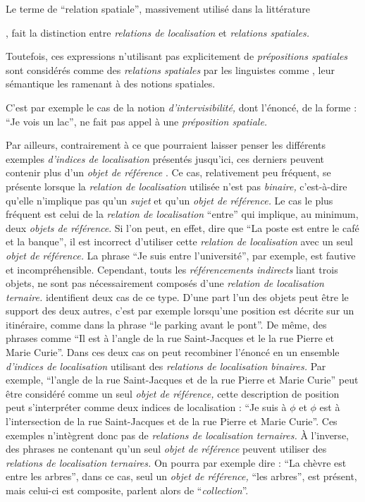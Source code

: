 Le terme de \enquote{relation spatiale}, massivement utilisé dans la
littérature 

\textcite{Duchene2019}, fait la distinction entre \emph{relations de
  localisation} et \emph{relations spatiales.}

Toutefois, ces expressions n'utilisant pas explicitement de
\emph{prépositions spatiales} sont considérés comme des
\emph{relations spatiales} par les linguistes comme
\textcite{Vandeloise1986}, leur sémantique les ramenant à des notions
spatiales.

C'est par exemple le cas de la notion \emph{d'intervisibilité,} dont
l'énoncé, de la forme : \enquote{Je vois un lac}, ne fait pas appel à
une \emph{préposition spatiale.}

Par ailleurs, contrairement à ce que pourraient laisser penser les
différents exemples \emph{d'indices de localisation} présentés
jusqu'ici, ces derniers peuvent contenir plus d'un \emph{objet de
  référence} \autocite{Clementini2013}. Ce cas, relativement peu
fréquent, se présente lorsque la \emph{relation de localisation}
utilisée n'est pas \emph{binaire,} c'est-à-dire qu'elle n'implique pas
qu'un \emph{sujet} et qu'un \emph{objet de référence.} Le cas le plus
fréquent est celui de la \emph{relation de localisation}
\enquote{entre} qui implique, au minimum, deux \emph{objets de
  référence}. Si l'on peut, en effet, dire que \enquote{La poste est
  entre le café et la banque}, il est incorrect d'utiliser cette
\emph{relation de localisation} avec un seul \emph{objet de
  référence.} La phrase \enquote{Je suis entre l'université}, par
exemple, est fautive et incompréhensible. Cependant, touts les
\emph{référencements indirects} liant trois objets, ne sont pas
nécessairement composés d'une \emph{relation de localisation
  ternaire.} \textcite{Duchene2019} identifient deux cas de ce
type. D'une part l'un des objets peut être le support des deux autres,
c'est par exemple lorsqu'une position est décrite sur un itinéraire,
comme dans la phrase \enquote{le parking avant le pont}. De même, des
phrases comme \enquote{Il est à l'angle de la rue Saint-Jacques et le
  la rue Pierre et Marie Curie}. Dans ces deux cas on peut recombiner
l'énoncé en un ensemble \emph{d'indices de localisation} utilisant des
\emph{relations de localisation binaires.} Par exemple,
\enquote{l'angle de la rue Saint-Jacques et de la rue Pierre et Marie
  Curie} peut être considéré comme un seul \emph{objet de référence,}
cette description de position peut s'interpréter comme deux indices de
localisation : \enquote{Je suis à $\phi$ et $\phi$ est à
  l'intersection de la rue Saint-Jacques et de la rue Pierre et Marie
  Curie}. Ces exemples n’intègrent donc pas de \emph{relations de
  localisation ternaires.} À l'inverse, des phrases ne contenant qu'un
seul \emph{objet de référence} peuvent utiliser des \emph{relations de
  localisation ternaires.} On pourra par exemple dire : \enquote{La
  chèvre est entre les arbres}, dans ce cas, seul un \emph{objet de
  référence,} \enquote{les arbres}, est présent, mais celui-ci est
composite, \textcite{Aurnague1993} parlent alors de
\enquote{\emph{collection}}. 


